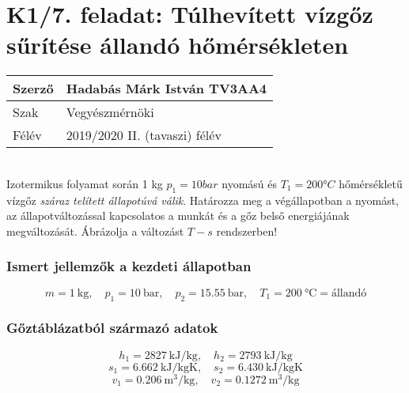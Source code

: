 	\section*{K1/7. feladat: Túlhevített vízgőz sűrítése állandó hőmérsékleten}
		\begin{tabular}{ | p{2cm} | p{14cm} | } 
			\hline
			Szerző & Hadabás Márk István TV3AA4 \\ 
			\hline
			Szak & Vegyészmérnöki \\ 
			\hline
			Félév & 2019/2020 II. (tavaszi) félév \\ 
			\hline
		\end{tabular}
			\vspace{0.5cm} 		
			\\
		Izotermikus folyamat során 1 kg $p_1=10 bar$ nyomású és $T_1=200 °C$ hőmérsékletű vízgőz \textit{száraz telített állapotúvá válik}. Határozza meg a végállapotban a nyomást, az állapotváltozással kapcsolatos a munkát és a  gőz belső energiájának megváltozását. Ábrázolja a változást $T-s$ rendszerben! \\
		\subsubsection{Ismert jellemzők a kezdeti állapotban} 
			\begin{equation*}
				m= \SI{1}{\kilogram}, 
				\quad
				p_1= \SI{10}{\bar},
				\quad
				p_2= \SI{15,55}{\bar},
				\quad
				T_1=\SI{200}{\celsius} = \text{állandó}
			\end{equation*}
		\subsubsection{Gőztáblázatból származó adatok}
			\begin{equation*}
				h_1 = \SI{2827}{\kilo\joule\per\kilogram}, 
				\quad
				h_2= \SI{2793}{\kilo\joule\per\kilogram}
			\end{equation*}
			\begin{equation*}
				s_1 = \SI{6,662}{\kilo\joule\per\kilogram\kelvin},
				\quad
				s_2 = \SI{6,430}{\kilo\joule\per\kilogram\kelvin}
			\end{equation*}
			\begin{equation*}
				v_1 = \SI{0,206}{\meter\cubed\per\kilogram},
				\quad
				v_2 = \SI{0,1272}{\meter\cubed\per\kilogram}
			\end{equation*}
			\noindent\hrulefill

